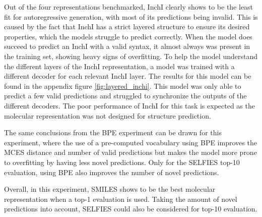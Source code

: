 Out of the four representations benchmarked, InchI clearly shows to be the least fit for autoregressive generation, with most of its predictions being invalid.
This is caused by the fact that InchI has a strict layered structure to ensure its desired properties, which the models struggle to predict correctly.
When the model does succeed to predict an InchI with a valid syntax, it almost always was present in the training set, showing heavy signs of overfitting.
To help the model understand the different layers of the InchI representation, a model was trained with a different decoder for each relevant InchI layer. 
The results for this model can be found in the appendix figure \ref{fig:layered_inchi}.
This model was only able to predict a few valid predictions and struggled to synchronize the outputs of the different decoders.
The poor performance of InchI for this task is expected as the molecular representation was not designed for structure prediction.

The same conclusions from the \ac{BPE} experiment can be drawn for this experiment, where the use of a pre-computed vocabulary using \ac{BPE} improves the MCES distance and number of valid predictions but makes the model more prone to overfitting by having less novel predictions.
Only for the SELFIES top-10 evaluation, using \ac{BPE} also improves the number of novel predictions.

Overall, in this experiment, SMILES shows to be the best molecular representation when a top-1 evaluation is used.
Taking the amount of novel predictions into account, SELFIES could also be considered for top-10 evaluation.
